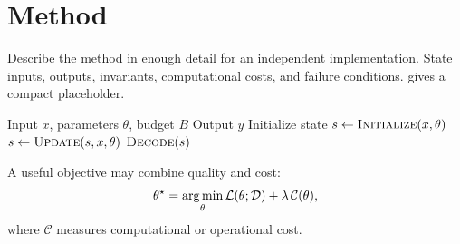 \section{Method}
\label{sec:method}

Describe the method in enough detail for an independent implementation. State inputs, outputs, invariants, computational costs, and failure conditions.  gives a compact placeholder.

\begin{algorithm}[t]
  \caption{Placeholder procedure for \methodname}
  \label{alg:method}
  \begin{algorithmic}[1]
    \Require Input $x$, parameters $\theta$, budget $B$
    \Ensure Output $y$
    \State Initialize state $s \gets \Call{Initialize}{x, \theta}$
      \State $s \gets \Call{Update}{s, x, \theta}$
    \EndFor
    \State \Return $\Call{Decode}{s}$
  \end{algorithmic}
\end{algorithm}

A useful objective may combine quality and cost:
\begin{equation}
  \theta^{\star}
  = \operatorname*{arg\,min}_{\theta}
    \mathcal{L}(\theta; \mathcal{D})
    + \lambda\,\mathcal{C}(\theta),
  \label{eq:objective}
\end{equation}
where $\mathcal{C}$ measures computational or operational cost.

